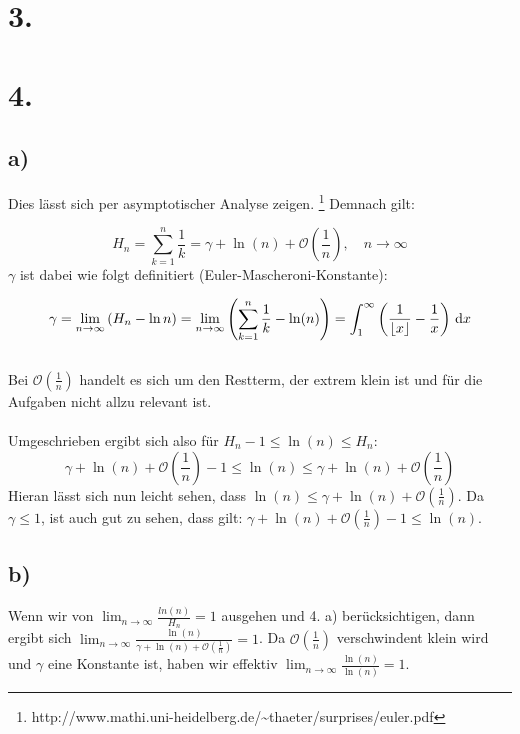 \documentclass[a4paper]{scrartcl}
\begin{document}
\section{3.}

\section{4.}
\subsection{a)}
Dies lässt sich per asymptotischer Analyse zeigen. \footnote{http://www.mathi.uni-heidelberg.de/\textasciitilde thaeter/surprises/euler.pdf}
Demnach gilt:

\[H_n=\sum_{k=1}^n \frac{1}{k} = \gamma + \ln (n) +\mathcal O\!\left(\frac 1{n}\right),\quad n\to\infty \]
%
\(\gamma\) ist dabei wie folgt definitiert (Euler-Mascheroni-Konstante):

\[ \gamma = \lim_{n\to\infty} \left(H_n - \ln n\right) = \lim_{n \rightarrow \infty } \left(\sum_{k=1}^n \frac{1}{k} - \ln(n) \right)=\int_1^\infty\left({1\over\lfloor x\rfloor}-{1\over x}\right)\,\mathrm dx \] \\
%
Bei \(\mathcal O\!\left(\frac 1{n}\right)\) handelt es sich um den Restterm, der extrem klein ist und für die Aufgaben nicht allzu relevant ist. \\ \\
%
Umgeschrieben ergibt sich also für \(H_n -1 \leq \ln (n) \leq H_n \):
\[ \gamma + \ln (n) +\mathcal O\!\left(\frac 1{n}\right) -1 \leq \ln (n) \leq \gamma + \ln (n) +\mathcal O\!\left(\frac 1{n}\right)\]
%
Hieran lässt sich nun leicht sehen, dass \( \ln (n) \leq \gamma + \ln (n) +\mathcal O\!\left(\frac 1{n}\right) \). Da \(\gamma \leq 1\), ist auch gut zu sehen, dass gilt: \( \gamma + \ln (n) +\mathcal O\!\left(\frac 1{n}\right) -1 \leq \ln (n) \).

\subsection{b)}
Wenn wir von \(\lim_{n\to\infty} \frac {ln(n)} {H_n} = 1 \) ausgehen und 4. a) berücksichtigen, dann ergibt sich \(\lim_{n\to\infty} \frac {\ln(n)} {\gamma + \ln (n) +\mathcal O\!\left(\frac 1{n}\right) } = 1 \). Da \(\mathcal O\!\left(\frac 1{n}\right)\) verschwindent klein wird und \(\gamma\) eine Konstante ist, haben wir effektiv \(\lim_{n\to\infty} \frac {\ln(n)} {\ln(n)} = 1\).
\end{document}
